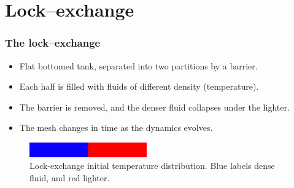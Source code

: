 
%

\section{Lock--exchange}

\begin{frame}
  \frametitle{The lock--exchange}
  \begin{itemize}
  \item Flat bottomed tank, separated into two partitions by a barrier.
  \item Each half is filled with fluids of different density (temperature).
  \item The barrier is removed, and the denser fluid collapses under the lighter.
  \item The mesh changes in time as the dynamics evolves. 
  \end{itemize}

  \begin{figure}
    \centering
    \includegraphics[width=0.45\textwidth]{./lock_exchange/le_basic_0_T}
    \caption{Lock-exchange initial temperature distribution.  Blue labels dense fluid, and red lighter.}
  \end{figure}
\end{frame}

